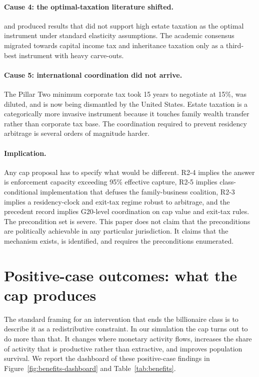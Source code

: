 \documentclass[11pt]{article}
\begin{document}
\paragraph{Cause 4: the optimal-taxation literature shifted.}
\citet{piketty2013theory} and \citet{farhi2010progressive} produced
results that did not support high estate taxation as the optimal
instrument under standard elasticity assumptions.  The academic
consensus migrated towards capital income tax and inheritance
taxation only as a third-best instrument with heavy carve-outs.

\paragraph{Cause 5: international coordination did not arrive.}
The Pillar Two minimum corporate tax took 15 years to negotiate
at 15\%, was diluted, and is now being dismantled by the United
States.  Estate taxation is a categorically more invasive
instrument because it touches family wealth transfer rather than
corporate tax base.  The coordination required to prevent
residency arbitrage is several orders of magnitude harder.

\paragraph{Implication.}  Any cap proposal has to specify what
would be different.  R2-4 implies the answer is enforcement
capacity exceeding 95\% effective capture, R2-5 implies
class-conditional implementation that defuses the family-business
coalition, R2-3 implies a residency-clock and exit-tax regime
robust to arbitrage, and the precedent record implies G20-level
coordination on cap value and exit-tax rules.  The precondition
set is severe.  This paper does not claim that the preconditions
are politically achievable in any particular jurisdiction.  It
claims that the mechanism exists, is identified, and requires the
preconditions enumerated.

\section{Positive-case outcomes: what the cap produces}
\label{sec:benefits}

The standard framing for an intervention that ends the billionaire
class is to describe it as a redistributive constraint.  In our
simulation the cap turns out to do more than that.  It changes
where monetary activity flows, increases the share of activity
that is productive rather than extractive, and improves population
survival.  We report the dashboard of these positive-case findings
in Figure~\ref{fig:benefits-dashboard} and Table~\ref{tab:benefits}.
\end{document}
